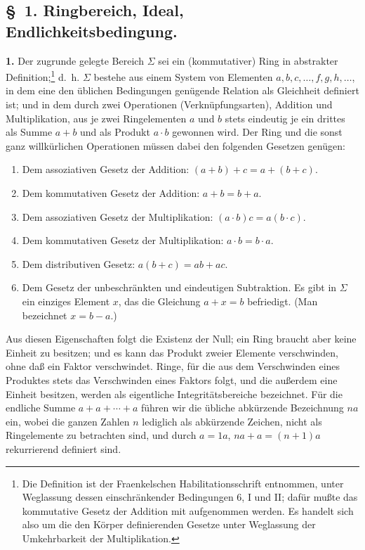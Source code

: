 \documentclass[11pt]{article}
\begin{document}
\subsection*{\S~1. Ringbereich, Ideal, Endlichkeitsbedingung.}

\textbf{1.} Der zugrunde gelegte Bereich $\Sigma$ sei ein (kommutativer) Ring in abstrakter Definition;\footnote{Die Definition ist der Fraenkelschen Habilitationsschrift entnommen, unter Weglassung dessen einschränkender Bedingungen 6, I und II; dafür mußte das kommutative Gesetz der Addition mit aufgenommen werden. Es handelt sich also um die den Körper definierenden Gesetze unter Weglassung der Umkehrbarkeit der Multiplikation.} d.~h. $\Sigma$ bestehe aus einem System von Elementen $a,b,c,\ldots,f,g,h,\ldots$, in dem eine den üblichen Bedingungen genügende Relation als Gleichheit definiert ist; und in dem durch zwei Operationen (Verknüpfungsarten), Addition und Multiplikation, aus je zwei Ringelementen $a$ und $b$ stets eindeutig je ein drittes als Summe $a+b$ und als Produkt $a\cdot b$ gewonnen wird. Der Ring und die sonst ganz willkürlichen Operationen müssen dabei den folgenden Gesetzen genügen:
\begin{enumerate}
\item Dem assoziativen Gesetz der Addition: $(a+b)+c=a+(b+c)$.
\item Dem kommutativen Gesetz der Addition: $a+b=b+a$.
\item Dem assoziativen Gesetz der Multiplikation: $(a\cdot b)c=a(b\cdot c)$.
\item Dem kommutativen Gesetz der Multiplikation: $a\cdot b=b\cdot a$.
\item Dem distributiven Gesetz: $a(b+c)=ab+ac$.
\item Dem Gesetz der unbeschränkten und eindeutigen Subtraktion. Es gibt in $\Sigma$ ein einziges Element $x$, das die Gleichung $a+x=b$ befriedigt. (Man bezeichnet $x=b-a$.)
\end{enumerate}
Aus diesen Eigenschaften folgt die Existenz der Null; ein Ring braucht aber keine Einheit zu besitzen; und es kann das Produkt zweier Elemente verschwinden, ohne daß ein Faktor verschwindet. Ringe, für die aus dem Verschwinden eines Produktes stets das Verschwinden eines Faktors folgt, und die außerdem eine Einheit besitzen, werden als eigentliche Integritätsbereiche bezeichnet. Für die endliche Summe $a+a+\cdots+a$ führen wir die übliche abkürzende Bezeichnung $na$ ein, wobei die ganzen Zahlen $n$ lediglich als abkürzende Zeichen, nicht als Ringelemente zu betrachten sind, und durch $a=1a$, $na+a=(n+1)a$ rekurrierend definiert sind.
\end{document}

